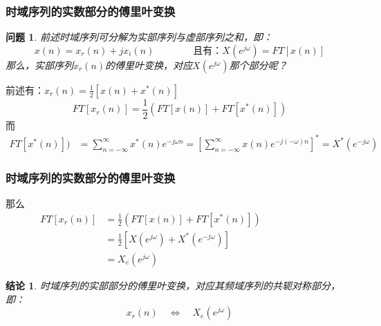 \documentclass[notheorems,compress,mathserif,table]{beamer}
\newtheorem{wenti}{问题}
\newtheorem{jielun}{结论}
\begin{document}
\begin{frame}[shrink]\frametitle{时域序列的实数部分的傅里叶变换}%
\begin{wenti}
前述时域序列可分解为实部序列与虚部序列之和，即：
$$x(n) = x_{r}(n)+j x_{i}(n) \qquad\qquad     \mbox{且有：} X(e^{j\omega}) = FT[x(n)] $$
那么，实部序列$x_{r}(n)$的傅里叶变换，对应$X(e^{j\omega})$那个部分呢？
\end{wenti}
\par 前述有：\quad\quad $ x_{r}(n) = \frac{1}{2}[x(n) + x^{*}(n)]$
$$FT[x_{r}(n)] = \frac{1}{2}(FT[x(n)] + FT[x^{*}(n)])$$
而
\begin{equation*}
\begin{split}
FT[x^{*}(n)])
&= \sum_{n=-\infty}^{\infty}x^{*}(n)e^{-j\omega n}
= \left[\sum_{n=-\infty}^{\infty}x(n)e^{-j(-\omega) n}\right]^{*}
= X^{*}(e^{-j\omega})
\end{split}
\end{equation*}

\end{frame}



\begin{frame}[shrink]\frametitle{ 时域序列的实数部分的傅里叶变换}%

那么
\begin{equation*}
\begin{split}
FT[x_{r}(n)] &= \frac{1}{2}(FT[x(n)] + FT[x^{*}(n)]) \qquad\qquad\qquad \\
&= \frac{1}{2}\left[X(e^{j\omega}) + X^{*}(e^{-j\omega})\right] \\
&= X_{e}(e^{j\omega})
\end{split}
\end{equation*}

\begin{jielun}
时域序列的实部部分的傅里叶变换，对应其频域序列的共轭对称部分，即：
$$x_{r}(n)\quad \Longleftrightarrow \quad X_{e}(e^{j\omega}) $$
\end{jielun}
\end{frame}
\end{document}
